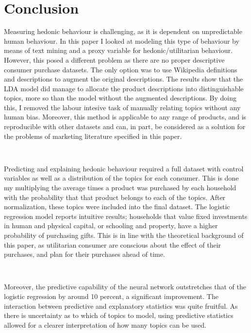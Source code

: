 \section{Conclusion} %
\label{sec:conclusion}



Measuring hedonic behaviour is challenging, as it is dependent on unpredictable human behaviour. In this paper I looked at modeling this type of behaviour by means of text mining and a proxy variable for hedonic/utilitarian behaviour. However, this posed a different problem as there are  no proper descriptive consumer purchase datasets. The only option was to use Wikipedia definitions and descriptions to augment the original descriptions. The results show that the LDA model did manage to allocate the product descriptions into distinguishable topics, more so than the model without the augmented descriptions. By doing this, I removed the labour intesive task of manually relating topics without any human bias. Moreover, this method is applicable to any range of products, and is reproducible with other datasets and can, in part, be considered as a solution for the problems of marketing literature specified in this paper. 

\

Predicting and explaining hedonic behaviour required a full dataset with control variables as well as a distribution of the topics for each consumer. This is done my multiplying the average times a product was purchased by each household with the probability that that product belongs to each of the topics. After normalization, these topics were included into the final dataset. The logistic regression model reports intuitive results; households that value fixed investments in human and physical capital, or schooling and property, have a higher probability of purchasing gifts. This is in line with the theoretical background of this paper, as utilitarian consumer are conscious about the effect of their purchases, and plan for their purchases ahead of time. 

\

Moreover, the predictive capability of the neural network outstretches that of the logistic regression by around 10 percent, a significant improvement. The interaction between predictive and explanatory statistics was quite fruitful. As there is uncertainty as to which of topics to model, using predictive statistics allowed for a clearer interpretation of how many topics can be used. 

\

